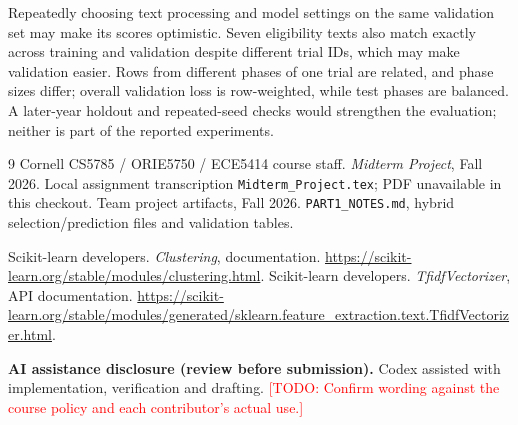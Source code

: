 \documentclass[10pt,twocolumn,letterpaper]{article}
\newcommand{\todo}[1]{\textcolor{red}{[TODO: #1]}}
\begin{document}
Repeatedly choosing text processing and model settings on the same validation
set may make its scores optimistic. Seven eligibility texts also match exactly across
training and validation despite different trial IDs, which may make validation
easier. Rows from different phases of one trial are related, and phase sizes
differ; overall validation loss is row-weighted, while test phases are balanced.
A later-year holdout and repeated-seed checks would strengthen the evaluation;
neither is part of the reported experiments.

\begin{thebibliography}{9}
 Cornell CS5785 / ORIE5750 / ECE5414 course staff.
\emph{Midterm Project}, Fall 2026. Local assignment transcription
\texttt{Midterm\_Project.tex}; PDF unavailable in this checkout.
 Team project artifacts, Fall 2026.
\texttt{PART1\_NOTES.md}, hybrid selection/prediction files and validation tables.

 Scikit-learn developers. \emph{Clustering}, documentation.
\url{https://scikit-learn.org/stable/modules/clustering.html}.
 Scikit-learn developers. \emph{TfidfVectorizer}, API documentation.
\url{https://scikit-learn.org/stable/modules/generated/sklearn.feature_extraction.text.TfidfVectorizer.html}.
\end{thebibliography}
\noindent\textbf{AI assistance disclosure (review before submission).}
Codex assisted with implementation, verification and drafting.
\todo{Confirm wording against the course policy and each contributor's actual use.}
\end{document}
